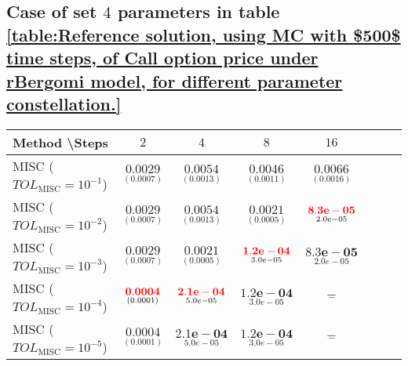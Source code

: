 \FloatBarrier
\subsection{Case of set $4$ parameters in table \ref{table:Reference solution, using MC with $500$ time steps, of Call option price under rBergomi model, for different parameter constellation.}}\label{appendix:Case of set 4 parameters}



\begin{table}[h!]
	\centering
	\begin{tabular}{l*{6}{c}r}
		Method \textbackslash  Steps            & $2$ & $4$ & $8$ & $16$  \\
		\hline
%			
		MISC ($TOL_{\text{MISC}}=10^{-1}$)  & $\underset{(   0.0007)}{\mathbf{   0.0029}}$ & $\underset{(
			
			0.0013)}{\mathbf{     0.0054}}$& $\underset{( 
			0.0011)}{\mathbf{   0.0046}}$  & $\underset{(    0.0016)}{\mathbf{     0.0066
		}}$   \\
%			
		MISC ($TOL_{\text{MISC}}=10^{-2}$)  & $\underset{(   0.0007)}{\mathbf{   0.0029}}$ &$\underset{(
			
			0.0013)}{\mathbf{     0.0054}}$ & $\underset{(0.0005)}{\mathbf{    0.0021
		}}$ &  $\underset{2.0e-05}{\mathbf{\red{8.3e-05}}}$  \\
		MISC ($TOL_{\text{MISC}}=10^{-3}$)  & $\underset{(   0.0007)}{\mathbf{   0.0029}}$ & $\underset{(0.0005
			)}{\mathbf{ 
				0.0021
		}}$ & $\underset{3.0e-05}{\mathbf{\red{1.2e-04}}}$ &  $\underset{2.0e-05}{\mathbf{8.3e-05}}$  \\
		MISC ($TOL_{\text{MISC}}=10^{-4}$)  & $\underset{( 0.0001)}{\mathbf{    \red{0.0004}}}$ & $\underset{5.0e-05}{\mathbf{\red{2.1e-04}}}$& $\underset{3.0e-05}{\mathbf{1.2e-04}}$ & $\underset{-}{\mathbf{-}}$  \\
		
		MISC ($TOL_{\text{MISC}}=10^{-5}$)  & $\underset{( 0.0001)}{\mathbf{   0.0004}}$ & $\underset{5.0e-05}{\mathbf{2.1e-04}}$& $\underset{3.0e-05}{\mathbf{1.2e-04}}$& $\underset{-}{\mathbf{-}}$  \\
		

\end{tabular}
\end{table}
